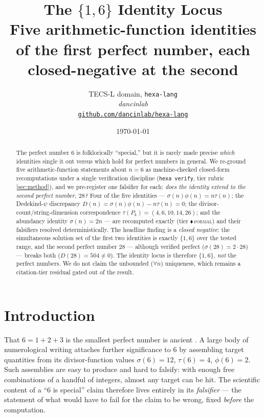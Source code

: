 \documentclass[11pt,a4paper]{article}
\title{
  \textbf{The \texorpdfstring{$\{1,6\}$}{\{1,6\}} Identity Locus}\\[4pt]
  \large Five arithmetic-function identities of the first perfect number,
  each closed-negative at the second
}
\author{
  TECS-L domain, \texttt{hexa-lang}\\
  \normalsize\textit{dancinlab}\\[2pt]
  \normalsize\href{https://github.com/dancinlab/hexa-lang}{\texttt{github.com/dancinlab/hexa-lang}}
}
\date{\today}
\newcommand{\sig}{\sigma}
\theoremstyle{definition}
\begin{document}
\maketitle

\begin{abstract}
The perfect number $6$ is folklorically ``special,'' but it is rarely made
precise \emph{which} identities single it out versus which hold for perfect
numbers in general. We re-ground five arithmetic-function statements about
$n=6$ as machine-checked closed-form recomputations under a single
verification discipline (\texttt{hexa verify}, tier rubric
\textsection\ref{sec:method}), and we pre-register one falsifier for each:
\emph{does the identity extend to the second perfect number, $28$?} Four of the
five identities --- $\sig(n)\phi(n)=n\tau(n)$; the Dedekind-$\psi$ discrepancy
$D(n)=\sig(n)\phi(n)-n\tau(n)=0$; the divisor-count/string-dimension
correspondence $\tau(P_k)=(4,6,10,14,26)$; and the abundancy identity
$\sig(n)=2n$ --- are recomputed exactly (tier
\textcolor{blue!60!black}{$\blacklozenge$}\,\textsc{formal}) and their
falsifiers resolved deterministically. The headline finding is a
\emph{closed negative}: the simultaneous solution set of the first two
identities is exactly $\{1,6\}$ over the tested range, and the second perfect
number $28$ --- although verified perfect ($\sig(28)=2\cdot 28$) --- breaks both
($D(28)=504\neq 0$). The identity locus is therefore $\{1,6\}$, \emph{not} the
perfect numbers. We do not claim the unbounded ($\forall n$) uniqueness, which
remains a citation-tier residual gated out of the result.
\end{abstract}

\section{Introduction}
\label{sec:intro}

That $6 = 1+2+3$ is the smallest perfect number is ancient
\citep{euclid,oeisA000396}. A large body of numerological writing attaches
further significance to $6$ by assembling target quantities from its
divisor-function values $\sig(6)=12$, $\tau(6)=4$, $\phi(6)=2$. Such
assemblies are easy to produce and hard to falsify: with enough free
combinations of a handful of integers, almost any target can be hit. The
scientific content of a ``$6$ is special'' claim therefore lives entirely in
its \emph{falsifier} --- the statement of what would have to fail for the claim
to be wrong, fixed \emph{before} the computation.
\end{document}
